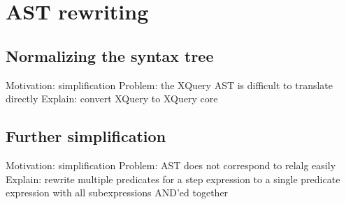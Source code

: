 \section{AST rewriting}

\subsection{Normalizing the syntax tree}
Motivation: simplification
Problem: the XQuery AST is difficult to translate directly
Explain: convert XQuery to XQuery core

\subsection{Further simplification}
Motivation: simplification
Problem: AST does not correspond to relalg easily
Explain: rewrite multiple predicates for a step expression to a single 
         predicate expression with all subexpressions AND'ed together